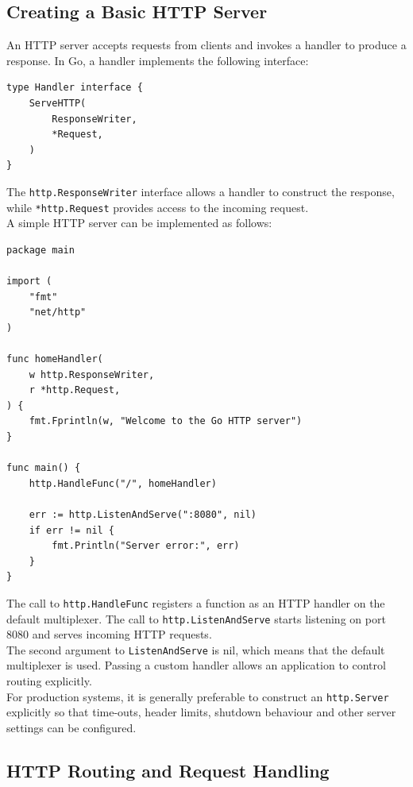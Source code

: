\subsection{Creating a Basic HTTP Server}

An HTTP server accepts requests from clients and invokes a handler to produce a response. In Go, a handler implements the following interface:

\begin{lstlisting}
type Handler interface {
    ServeHTTP(
        ResponseWriter,
        *Request,
    )
}
\end{lstlisting}

The \texttt{http.ResponseWriter} interface allows a handler to construct the response, while \texttt{*http.Request} provides access to the incoming request.\\

A simple HTTP server can be implemented as follows:

\begin{lstlisting}
package main

import (
    "fmt"
    "net/http"
)

func homeHandler(
    w http.ResponseWriter,
    r *http.Request,
) {
    fmt.Fprintln(w, "Welcome to the Go HTTP server")
}

func main() {
    http.HandleFunc("/", homeHandler)

    err := http.ListenAndServe(":8080", nil)
    if err != nil {
        fmt.Println("Server error:", err)
    }
}
\end{lstlisting}

The call to \texttt{http.HandleFunc} registers a function as an HTTP handler on the default multiplexer. The call to \texttt{http.ListenAndServe} starts listening on port 8080 and serves incoming HTTP requests.\\

The second argument to \texttt{ListenAndServe} is nil, which means that the default multiplexer is used. Passing a custom handler allows an application to control routing explicitly.\\

For production systems, it is generally preferable to construct an \texttt{http.Server} explicitly so that time-outs, header limits, shutdown behaviour and other server settings can be configured.\\

\subsection{HTTP Routing and Request Handling}


